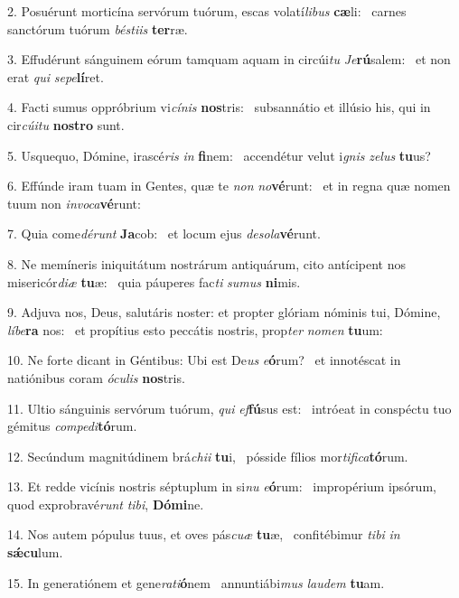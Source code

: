 2. Posuérunt morticína servórum tuórum, escas volatí\textit{li}\textit{bus} \textbf{cæ}li: \ast\  carnes sanctórum tuórum \textit{bés}\textit{ti}\textit{is} \textbf{ter}ræ.\

3. Effudérunt sánguinem eórum tamquam aquam in circúi\textit{tu} \textit{Je}\textbf{rú}salem: \ast\  et non erat \textit{qui} \textit{se}\textit{pe}\textbf{lí}ret.\

4. Facti sumus oppróbrium vi\textit{cí}\textit{nis} \textbf{nos}tris: \ast\  subsannátio et illúsio his, qui in cir\textit{cú}\textit{i}\textit{tu} \textbf{nos}\textbf{tro} sunt.\

5. Usquequo, Dómine, irascé\textit{ris} \textit{in} \textbf{fi}nem: \ast\  accendétur velut i\textit{gnis} \textit{ze}\textit{lus} \textbf{tu}us?\

6. Effúnde iram tuam in Gentes, quæ te \textit{non} \textit{no}\textbf{vé}runt: \ast\  et in regna quæ nomen tuum non \textit{in}\textit{vo}\textit{ca}\textbf{vé}runt:\

7. Quia come\textit{dé}\textit{runt} \textbf{Ja}cob: \ast\  et locum ejus \textit{de}\textit{so}\textit{la}\textbf{vé}runt.\

8. Ne memíneris iniquitátum nostrárum antiquárum, cito antícipent nos misericór\textit{di}\textit{æ} \textbf{tu}æ: \ast\  quia páuperes fac\textit{ti} \textit{su}\textit{mus} \textbf{ni}mis.\

9. Adjuva nos, Deus, salutáris noster: et propter glóriam nóminis tui, Dómine, \textit{lí}\textit{be}\textbf{ra} nos: \ast\  et propítius esto peccátis nostris, prop\textit{ter} \textit{no}\textit{men} \textbf{tu}um:\

10. Ne forte dicant in Géntibus: Ubi est De\textit{us} \textit{e}\textbf{ó}rum? \ast\  et innotéscat in natiónibus coram \textit{ó}\textit{cu}\textit{lis} \textbf{nos}tris.\

11. Ultio sánguinis servórum tuórum, \textit{qui} \textit{ef}\textbf{fú}sus est: \ast\  intróeat in conspéctu tuo gémitus \textit{com}\textit{pe}\textit{di}\textbf{tó}rum.\

12. Secúndum magnitúdinem brá\textit{chi}\textit{i} \textbf{tu}i, \ast\  pósside fílios mor\textit{ti}\textit{fi}\textit{ca}\textbf{tó}rum.\

13. Et redde vicínis nostris séptuplum in si\textit{nu} \textit{e}\textbf{ó}rum: \ast\  impropérium ipsórum, quod exprobravé\textit{runt} \textit{ti}\textit{bi}, \textbf{Dó}\textbf{mi}ne.\

14. Nos autem pópulus tuus, et oves pás\textit{cu}\textit{æ} \textbf{tu}æ, \ast\  confitébimur \textit{ti}\textit{bi} \textit{in} \textbf{sǽ}\textbf{cu}lum.\

15. In generatiónem et gene\textit{ra}\textit{ti}\textbf{ó}nem \ast\  annuntiábi\textit{mus} \textit{lau}\textit{dem} \textbf{tu}am.\

